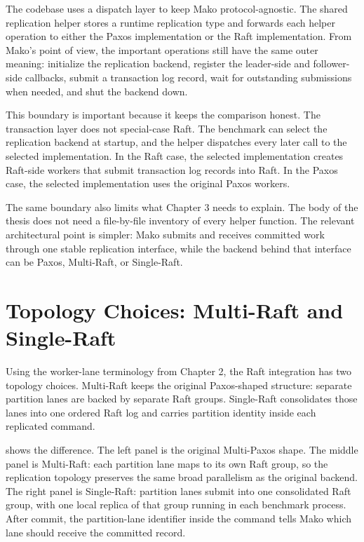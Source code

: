 The codebase uses a dispatch layer to keep Mako protocol-agnostic. The shared
replication helper stores a runtime replication type and forwards each helper
operation to either the Paxos implementation or the Raft implementation. From
Mako's point of view, the important operations still have the same outer
meaning: initialize the replication backend, register the leader-side and
follower-side callbacks, submit a transaction log record, wait for outstanding
submissions when needed, and shut the backend down.

This boundary is important because it keeps the comparison honest. The
transaction layer does not special-case Raft. The benchmark can select the
replication backend at startup, and the helper dispatches every later call to
the selected implementation. In the Raft case, the selected implementation
creates Raft-side workers that submit transaction log records into Raft. In
the Paxos case, the selected implementation uses the original Paxos workers.

The same boundary also limits what Chapter 3 needs to explain. The body of the
thesis does not need a file-by-file inventory of every helper function. The
relevant architectural point is simpler: Mako submits and receives committed
work through one stable replication interface, while the backend behind that
interface can be Paxos, Multi-Raft, or Single-Raft.

\section{Topology Choices: Multi-Raft and Single-Raft}

Using the worker-lane terminology from Chapter 2, the Raft integration has two
topology choices. Multi-Raft keeps the original Paxos-shaped structure:
separate partition lanes are backed by separate Raft groups. Single-Raft
consolidates those lanes into one ordered Raft log and carries partition
identity inside each replicated command.

 shows the difference. The left panel is
the original Multi-Paxos shape. The middle panel is Multi-Raft: each partition
lane maps to its own Raft group, so the replication topology preserves the
same broad parallelism as the original backend. The right panel is
Single-Raft: partition lanes submit into one consolidated Raft group, with one
local replica of that group running in each benchmark process. After commit,
the partition-lane identifier inside the command tells Mako which lane should
receive the committed record.

